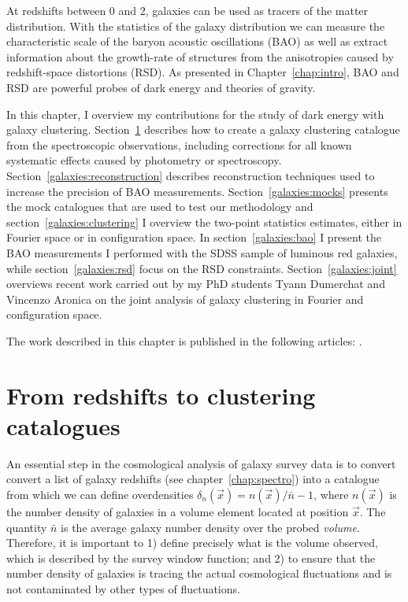\chaptertoc{}

\vspace{1em}

At redshifts between 0 and 2, galaxies can be used as tracers of
the matter distribution. With the statistics of the galaxy distribution 
we can measure the characteristic scale of the baryon acoustic oscillations (BAO) 
as well as extract information about the growth-rate of structures from 
the anisotropies caused by redshift-space distortions (RSD). 
As presented in Chapter~\ref{chap:intro}, BAO and RSD are powerful 
probes of dark energy and theories of gravity. 

In this chapter, I overview my contributions for the study of dark energy 
with galaxy clustering. Section~\ref{galaxies:catalogue} describes how to 
create a galaxy clustering catalogue from the spectroscopic observations, 
including corrections for all known systematic effects caused by photometry 
or spectroscopy.
Section~\ref{galaxies:reconstruction} describes reconstruction techniques
used to increase the precision of BAO measurements. 
Section~\ref{galaxies:mocks} presents the mock catalogues that are used to 
test our methodology and section~\ref{galaxies:clustering} I overview the 
two-point statistics estimates, either in Fourier space or in configuration space.  
In section~\ref{galaxies:bao} I present the BAO measurements I performed 
with the SDSS sample of luminous red galaxies, while section~\ref{galaxies:rsd}
focus on the RSD constraints. Section~\ref{galaxies:joint} 
overviews recent work carried out by my PhD students Tyann Dumerchat 
and Vincenzo Aronica on the joint analysis of galaxy clustering in 
Fourier and configuration space. 

The work described in this chapter is published in the following 
articles: 
\cite{bautistaSDSSIVExtendedBaryon2018, 
bautistaCompletedSDSSIVExtended2021,
gil-marinCompletedSDSSIVExtended2020,
rossCompletedSDSSIVExtended2020,
zhaoCompletedSDSSIVExtended2021,
dumerchatBaryonAcousticOscillations2022a}. 

\section{From redshifts to clustering catalogues}
\label{galaxies:catalogue}

An essential step in the cosmological analysis of galaxy survey data is 
to convert convert a list of galaxy redshifts (see chapter~\ref{chap:spectro}) 
into a catalogue from which we can define overdensities 
$\delta_n(\vec{x}) = n(\vec{x})/\bar{n} - 1$, where $n(\vec{x})$ is the 
number density of galaxies in a volume element located at position $\vec{x}$. 
The quantity $\bar{n}$ is the average galaxy number density over the probed 
\emph{volume}. Therefore, it is important to 1) define precisely what is the 
volume observed, which is described by the survey window function; and 
2) to ensure that the number density of galaxies is tracing the actual 
cosmological fluctuations and is not contaminated by other types of fluctuations.  

